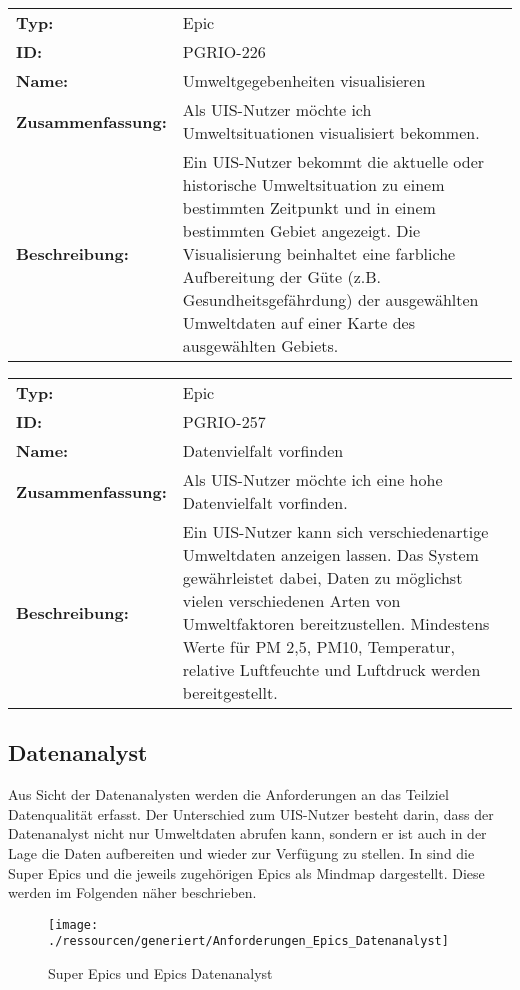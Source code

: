 		\begin{flushleft} 
\begin{tabular}{@{}lp{100mm}} 
\textbf{Typ:} & Epic \\ 
\textbf{ID:} & PGRIO-226 \\ 
\textbf{Name:} & Umweltgegebenheiten visualisieren \\ 
\textbf{Zusammenfassung:} & Als UIS-Nutzer möchte ich Umweltsituationen visualisiert bekommen. \\ 
\textbf{Beschreibung:} & Ein UIS-Nutzer bekommt die aktuelle oder historische Umweltsituation zu einem bestimmten Zeitpunkt und in einem bestimmten Gebiet angezeigt. Die Visualisierung beinhaltet eine farbliche Aufbereitung der Güte (z.B. Gesundheitsgefährdung) der ausgewählten Umweltdaten auf einer Karte des ausgewählten Gebiets. \\ 
\end{tabular} 
\end{flushleft} 

		\begin{flushleft} 
\begin{tabular}{@{}lp{100mm}} 
\textbf{Typ:} & Epic \\ 
\textbf{ID:} & PGRIO-257 \\ 
\textbf{Name:} & Datenvielfalt vorfinden \\ 
\textbf{Zusammenfassung:} & Als UIS-Nutzer möchte ich eine hohe Datenvielfalt vorfinden. \\ 
\textbf{Beschreibung:} & Ein UIS-Nutzer kann sich verschiedenartige Umweltdaten anzeigen lassen. Das System gewährleistet dabei, Daten zu möglichst vielen verschiedenen Arten von Umweltfaktoren bereitzustellen. Mindestens Werte für PM 2,5, PM10, Temperatur, relative Luftfeuchte und Luftdruck werden bereitgestellt. \\ 
\end{tabular} 
\end{flushleft} 

\subsection{Datenanalyst}
Aus Sicht der Datenanalysten werden die Anforderungen an das Teilziel Datenqualität erfasst. Der Unterschied zum UIS-Nutzer besteht darin, dass der Datenanalyst nicht nur Umweltdaten abrufen kann, sondern er ist auch in der Lage die Daten aufbereiten und wieder zur Verfügung zu stellen. In  sind die Super Epics und die jeweils zugehörigen Epics als Mindmap dargestellt. Diese werden im Folgenden näher beschrieben.
\begin{figure}[H]
	\centering
	\texttt{[image: ./ressourcen/generiert/Anforderungen\_Epics\_Datenanalyst]}
	\caption{Super Epics und Epics Datenanalyst}
	\label{fig:DatenanlystEpics}
\end{figure}

